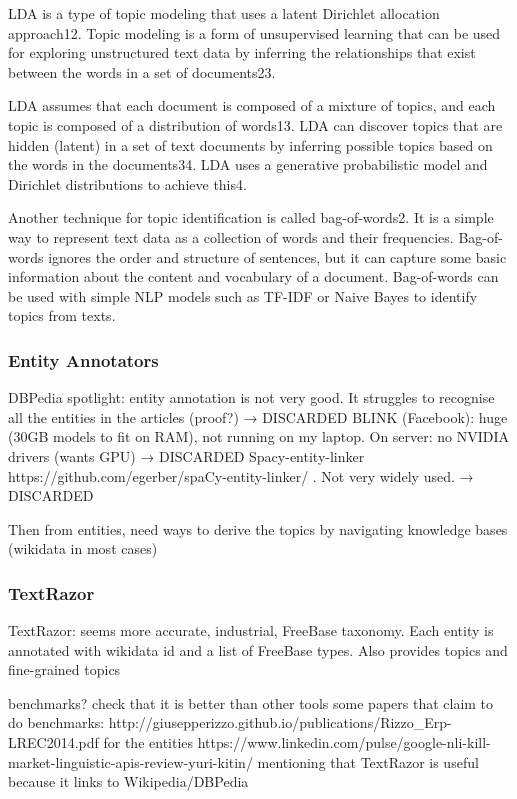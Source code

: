 LDA is a type of topic modeling that uses a latent Dirichlet allocation approach12. Topic modeling is a form of unsupervised learning that can be used for exploring unstructured text data by inferring the relationships that exist between the words in a set of documents23.

LDA assumes that each document is composed of a mixture of topics, and each topic is composed of a distribution of words13. LDA can discover topics that are hidden (latent) in a set of text documents by inferring possible topics based on the words in the documents34. LDA uses a generative probabilistic model and Dirichlet distributions to achieve this4.

Another technique for topic identification is called bag-of-words2. It is a simple way to represent text data as a collection of words and their frequencies. Bag-of-words ignores the order and structure of sentences, but it can capture some basic information about the content and vocabulary of a document. Bag-of-words can be used with simple NLP models such as TF-IDF or Naive Bayes to identify topics from texts.


\subsubsection{Entity Annotators}
DBPedia spotlight: entity annotation is not very good. It struggles to recognise all the entities in the articles (proof?) → DISCARDED
BLINK (Facebook): huge (30GB models to fit on RAM), not running on my laptop. On server: no NVIDIA drivers (wants GPU) → DISCARDED
Spacy-entity-linker https://github.com/egerber/spaCy-entity-linker/ . Not very widely used. → DISCARDED

Then from entities, need ways to derive the topics by navigating knowledge bases (wikidata in most cases)

\subsubsection{TextRazor}
TextRazor: seems more accurate, industrial, FreeBase taxonomy. Each entity is annotated with wikidata id and a list of FreeBase types. Also provides topics and fine-grained topics

benchmarks? check that it is better than other tools
some papers that claim to do benchmarks:
http://giusepperizzo.github.io/publications/Rizzo\_Erp-LREC2014.pdf for the entities
https://www.linkedin.com/pulse/google-nli-kill-market-linguistic-apis-review-yuri-kitin/ mentioning that TextRazor is useful because it links to Wikipedia/DBPedia

